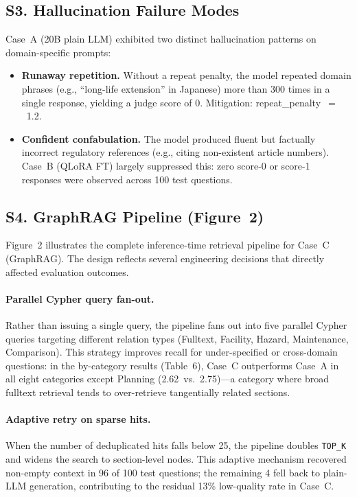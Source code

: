 \documentclass[twocolumn]{article}
\begin{document}
\subsection*{S3. Hallucination Failure Modes}

Case~A (20B plain LLM) exhibited two distinct hallucination patterns on domain-specific prompts:

\begin{itemize}
  \item \textbf{Runaway repetition.}
        Without a repeat penalty, the model repeated domain phrases
        (e.g., ``long-life extension'' in Japanese) more than 300 times in a single response,
        yielding a judge score of 0.
        Mitigation: repeat\_penalty~$=$~1.2.
  \item \textbf{Confident confabulation.}
        The model produced fluent but factually incorrect regulatory references
        (e.g., citing non-existent article numbers).
        Case~B (QLoRA FT) largely suppressed this: zero score-0 or score-1 responses
        were observed across 100 test questions.
\end{itemize}

\subsection*{S4. GraphRAG Pipeline (Figure~2)}

Figure~2 illustrates the complete inference-time retrieval pipeline for Case~C (GraphRAG).
The design reflects several engineering decisions that directly affected evaluation outcomes.

\paragraph{Parallel Cypher query fan-out.}
Rather than issuing a single query, the pipeline fans out into five parallel Cypher queries
targeting different relation types (Fulltext, Facility, Hazard, Maintenance, Comparison).
This strategy improves recall for under-specified or cross-domain questions:
in the by-category results (Table~6), Case~C outperforms Case~A in all
eight categories except Planning (2.62~vs.\ 2.75)---a category where broad fulltext retrieval
tends to over-retrieve tangentially related sections.

\paragraph{Adaptive retry on sparse hits.}
When the number of deduplicated hits falls below 25, the pipeline doubles \texttt{TOP\_K} and
widens the search to section-level nodes.
This adaptive mechanism recovered non-empty context in 96 of 100 test questions;
the remaining 4 fell back to plain-LLM generation, contributing to the residual 13\%
low-quality rate in Case~C.
\end{document}
